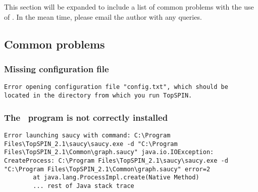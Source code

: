 \chapter{\troubleshooting}\label{chapter:troubleshooting}

This section will be expanded to include a list of common problems
with the use of \topspin.  In the mean time, please email the author
with any queries.


\section{Common problems}


\subsection{Missing configuration file}


\exampleerrormessage

\begin{lstlisting}
Error opening configuration file "config.txt", which should be
located in the directory from which you run TopSPIN.
\end{lstlisting}



\subsection{The \saucy\ program is not correctly installed}


\exampleerrormessage

\begin{lstlisting}
Error launching saucy with command: C:\Program
Files\TopSPIN_2.1\saucy\saucy.exe -d "C:\Program
Files\TopSPIN_2.1\Common\graph.saucy" java.io.IOException:
CreateProcess: C:\Program Files\TopSPIN_2.1\saucy\saucy.exe -d
"C:\Program Files\TopSPIN_2.1\Common\graph.saucy" error=2
        at java.lang.ProcessImpl.create(Native Method)
        ... rest of Java stack trace
\end{lstlisting}


